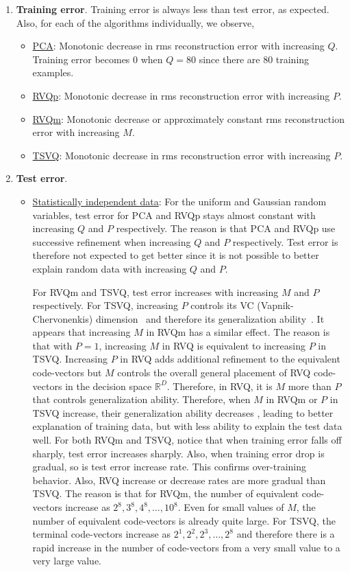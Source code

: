 \begin{Body}
\begin{enumerate}
\item \textbf{Training error}. Training error is always less than test error, as expected. Also, for each of the algorithms individually, we observe,
\begin{itemize}
\item \underline{PCA}: Monotonic decrease in rms reconstruction error with increasing $Q$. Training error becomes 0 when $Q=80$ since there are 80 training examples.
\item \underline{RVQp}: Monotonic decrease in rms reconstruction error with increasing $P$.
\item \underline{RVQm}: Monotonic decrease or approximately constant rms reconstruction error with increasing $M$.
\item \underline{TSVQ}: Monotonic decrease in rms reconstruction error with increasing $P$.
\end{itemize}
\item \textbf{Test error}.
\begin{itemize}
\item \underline{Statistically independent data}: For the uniform and Gaussian random variables, test error for PCA and RVQp stays almost constant with increasing $Q$ and $P$ respectively.  The reason is that PCA and RVQp use successive refinement when increasing $Q$ and $P$ respectively.  Test error is therefore not expected to get better since it is not possible to better explain random data with increasing $Q$ and $P$.

For RVQm and TSVQ, test error increases with increasing $M$ and $P$ respectively.  For TSVQ, increasing $P$ controls its VC (Vapnik-Chervonenkis) dimension~\cite{1999_BOOK_PRML_Vapnik} and therefore its generalization ability~\cite{2003_JNL_PRML_Karacali}.  It appears that increasing $M$ in RVQm has a similar effect.  The reason is that with $P=1$, increasing $M$ in RVQ is equivalent to increasing $P$ in TSVQ.  Increasing $P$ in RVQ adds additional refinement to the equivalent code-vectors but $M$ controls the overall general placement of RVQ code-vectors in the decision space $\mathbb{R}^D$.  Therefore, in RVQ, it is $M$ more than $P$ that controls generalization ability.  Therefore, when $M$ in RVQm or $P$ in TSVQ increase, their generalization ability decreases , leading to better explanation of training data, but with less ability to explain the test data well. For both RVQm and TSVQ, notice that when training error falls off sharply, test error increases sharply. Also, when training error drop is gradual, so is test error increase rate. This confirms over-training behavior. Also, RVQ increase or decrease rates are more gradual than TSVQ.  The reason is that for RVQm, the number of equivalent code-vectors increase as $2^8, 3^8, 4^8, \ldots, 10^8$.  Even for small values of $M$, the number of equivalent code-vectors is already quite large.  For TSVQ, the terminal code-vectors increase as $2^1, 2^2, 2^3, \ldots, 2^8$ and therefore there is a rapid increase in the number of code-vectors from a very small value to a very large value.


\end{itemize}
\end{enumerate}
\end{Body}
